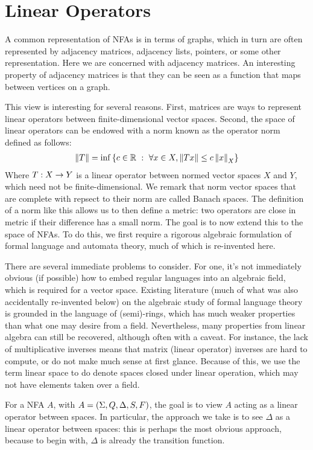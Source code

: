 
\section{Linear Operators}

A common representation of NFAs is in terms of graphs,
which in turn are often represented by adjacency matrices,
adjacency lists, pointers, or some other representation.
Here we are concerned with adjacency matrices.
An interesting property of adjacency matrices is that they can be seen
as a function that maps between vertices on a graph.

This view is interesting for several reasons.
First, matrices are ways to represent linear operators
between finite-dimensional vector spaces.
Second, the space of linear operators can be endowed with a norm
known as the operator norm defined as follows:
\begin{align*}
  \left\lVert T\right\rVert
    = \inf\left\{c \in \mathbb{R} \  : \ 
              \forall x \in X, \left\lVert Tx\right\rVert \leq c \left\lVert x\right\rVert_X\right\}
\end{align*}
Where \(T : X \to Y\) is a linear operator between
normed vector spaces \(X\) and \(Y\), which need not be finite-dimensional.
We remark that norm vector spaces that are complete with repsect to their
norm are called Banach spaces.
The definition of a norm like this allows us to then define a metric:
two operators are close in metric if their difference has a small norm.
The goal is to now extend this to the space of NFAs.
To do this, we first require a rigorous algebraic formulation of
formal language and automata theory, much of which is re-invented here.

There are several immediate problems to consider.
For one, it's not immediately obvious (if possible) how to embed
regular languages into an algebraic field,
which is required for a vector space.
Existing literature (much of what was also accidentally re-invented below)
on the algebraic study of formal language theory is grounded
in the language of (semi)-rings,
which has much weaker properties than what one may desire from a field.
Nevertheless, many properties from linear algebra can still be recovered,
although often with a caveat.
For instance, the lack of multiplicative inverses means that
matrix (linear operator) inverses are hard to compute,
or do not make much sense at first glance.
Because of this, we use the term linear space to do denote spaces
closed under linear operation, which may not have elements taken
over a field.

For a NFA \(A\), with \(A = \left(\Sigma, Q, \Delta, S, F\right)\),
the goal is to view \(A\) acting as a linear operator between spaces.
In particular, the approach we take is to see \(\Delta\) as a
linear operator between spaces: this is perhaps the most obvious approach,
because to begin with, \(\Delta\) is already the transition function.

